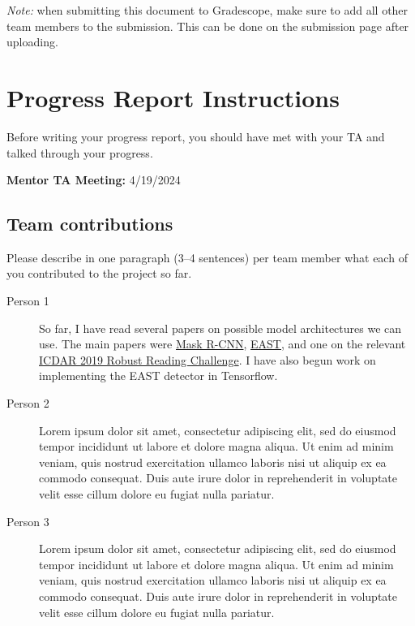 \emph{Note:} when submitting this document to Gradescope, make sure to add all other team members to the submission. This can be done on the submission page after uploading.

\section*{Progress Report Instructions}

Before writing your progress report, you should have met with your TA and talked through your progress.

\textbf{Mentor TA Meeting:} 4/19/2024

\subsection*{Team contributions}

Please describe in one paragraph (3--4 sentences) per team member what each of you contributed to the project so far.
\begin{description}

\item[Person 1] So far, I have read several papers on possible model architectures we can use. The main papers were \href{http://arxiv.org/abs/2206.00311}{Mask R-CNN}, \href{https://arxiv.org/pdf/1704.03155.pdf}{EAST}, and one on the relevant \href{https://arxiv.org/pdf/1907.00945.pdf}{ICDAR 2019 Robust Reading Challenge}. I have also begun work on implementing the EAST detector in Tensorflow.

\item[Person 2] Lorem ipsum dolor sit amet, consectetur adipiscing elit, sed do eiusmod tempor incididunt ut labore et dolore magna aliqua. Ut enim ad minim veniam, quis nostrud exercitation ullamco laboris nisi ut aliquip ex ea commodo consequat. Duis aute irure dolor in reprehenderit in voluptate velit esse cillum dolore eu fugiat nulla pariatur.

\item [Person 3] Lorem ipsum dolor sit amet, consectetur adipiscing elit, sed do eiusmod tempor incididunt ut labore et dolore magna aliqua. Ut enim ad minim veniam, quis nostrud exercitation ullamco laboris nisi ut aliquip ex ea commodo consequat. Duis aute irure dolor in reprehenderit in voluptate velit esse cillum dolore eu fugiat nulla pariatur. 

\end{description}

